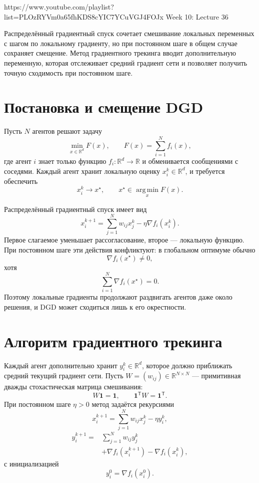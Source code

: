 
\sourcevideo
    {https://www.youtube.com/playlist?list=PLOzRYVm0a65fhKDS8cYIC7YCuVGJ4FOJx}
    {Week 10: Lecture 36}

Распределённый градиентный спуск сочетает смешивание локальных
переменных с шагом по локальному градиенту, но при постоянном шаге в
общем случае сохраняет смещение. Метод градиентного трекинга вводит
дополнительную переменную, которая отслеживает средний градиент сети и
позволяет получить точную сходимость при постоянном шаге.

\section{Постановка и смещение DGD}

Пусть \(N\) агентов решают задачу
\[
    \min_{x\in\mathbb R^d} F(x),
    \qquad
    F(x)=\sum_{i=1}^{N}f_i(x),
\]
где агент \(i\) знает только функцию
\(f_i\colon\mathbb R^d\to\mathbb R\) и обменивается сообщениями с
соседями. Каждый агент хранит локальную оценку
\(x_i^k\in\mathbb R^d\), и требуется обеспечить
\[
    x_i^k\longrightarrow x^\star,
    \qquad
    x^\star\in\operatorname*{arg\,min}_{x}F(x).
\]

Распределённый градиентный спуск имеет вид
\[
    x_i^{k+1}
    =
    \sum_{j=1}^{N}w_{ij}x_j^k
    -\eta\nabla f_i(x_i^k).
\]
Первое слагаемое уменьшает рассогласование, второе --- локальную
функцию. При постоянном шаге эти действия конфликтуют: в глобальном
оптимуме обычно
\[
    \nabla f_i(x^\star)\ne0,
\]
хотя
\[
    \sum_{i=1}^{N}\nabla f_i(x^\star)=0.
\]
Поэтому локальные градиенты продолжают раздвигать агентов даже около
решения, и DGD может сходиться лишь к его окрестности.

\section{Алгоритм градиентного трекинга}

Каждый агент дополнительно хранит \(y_i^k\in\mathbb R^d\), которое
должно приближать средний текущий градиент сети. Пусть
\(W=(w_{ij})\in\mathbb R^{N\times N}\) --- примитивная дважды
стохастическая матрица смешивания:
\[
    W\mathbf1=\mathbf1,
    \qquad
    \mathbf1^{\mathsf T}W=\mathbf1^{\mathsf T}.
\]
При постоянном шаге \(\eta>0\) метод задаётся рекурсиями
\[
    x_i^{k+1}
    =
    \sum_{j=1}^{N}w_{ij}x_j^k
    -\eta y_i^k,
\]
\[
\begin{aligned}
    y_i^{k+1}
    ={}&
    \sum_{j=1}^{N}w_{ij}y_j^k
    \\
    &+
    \nabla f_i(x_i^{k+1})
    -
    \nabla f_i(x_i^k),
\end{aligned}
\]
с инициализацией
\[
    y_i^0=\nabla f_i(x_i^0).
\]

